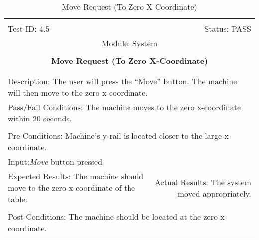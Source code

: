 \documentclass[titlepage]{article}
\begin{document}
\begin{center}
\begin{table}[h!]
\begin{tabular}{|l r|}\hline&\\[-2mm]
	Test ID: 4.5	&Status: PASS\\[-3mm]
	\multicolumn{2}{|c|}{Module: System}\\&\\
	\multicolumn{2}{|c|}{\textbf{\large{Move Request (To Zero X-Coordinate)}}}\\&\\\hline&\\[-3mm]
	\multicolumn{2}{|p{\textwidth}|}{Description: The user will press the ``Move'' button. The machine will then move to the zero x-coordinate.}\\\hline
	\multicolumn{2}{|p{\textwidth}|}{Pass/Fail Conditions: The machine moves to the zero x-coordinate within 20 seconds.}\\[1mm]\hline&\\[-3mm]
	\multicolumn{2}{|p{\textwidth}|}{Pre-Conditions: Machine's y-rail is located closer to the large x-coordinate.}\\[4mm]
	\multicolumn{2}{|p{\textwidth}|}{Input:\newline\textit{Move} button pressed}\\[2mm]\hline
	\multicolumn{1}{|p{0.49\textwidth}}{Expected Results: The machine should move to the zero x-coordinate of the table.}	&\multicolumn{1}{|p{0.45\textwidth}|}{Actual Results: The system moved appropriately.}\\\hline&\\[-3mm]
	\multicolumn{2}{|p{\textwidth}|}{Post-Conditions: The machine should be located at the zero x-coordinate.}\\\hline
\end{tabular}
\caption{Move Request (To Zero X-Coordinate)}
\end{table}
\end{center}
\end{document}
